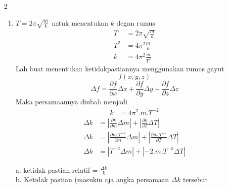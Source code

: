 \documentclass[10pt,a4paper]{article}
\begin{document}
\begin{multicols*} {2}
\begin{enumerate}[itemsep=0mm]
\item $T=2\pi \sqrt{\frac{m}{k}}$ untuk menentukan $k$ degan rumus
\begin{align*}
T&= 2\pi \sqrt{\frac{m}{k}}\\
T^2&=4\pi^2\frac{m}{k}\\
k&=4\pi^2\frac{m}{T^2}
\end{align*}
Lah buat menentukan ketidakpastiannya menggunakan rumus gayut
$$f(x,y,z)$$
$$\Delta f = \frac{\partial f}{\partial x}\Delta x + \frac{\partial f}{\partial y}\Delta y +\frac{\partial f}{\partial z}\Delta z$$
Maka persamaannya diubah menjadi 
\\
\begin{align*}
k&=4\pi^2.m.T^{-2}
\end {align*}
\begin{align*}
\Delta k &= |\frac{\partial k}{\partial m} \Delta m| +|\frac{\partial k}{\partial T}\Delta T|\\
\Delta k &= |\frac{\partial m.T^{-2}}{\partial m}\Delta m|+|\frac{\partial m.T^{-2}}{\partial T}\Delta T|\\
\Delta k &=| T^{-2}\Delta m| +|-2.m.T^{-3}\Delta T|
\end{align*}

a. ketidak pastian relatif = $\frac{\Delta k}{k}$\\
b. Ketidak pastian (masukin aja angka persamaan $\Delta k$ tersebut


\end{enumerate}
\end{multicols*}
\end{document}
